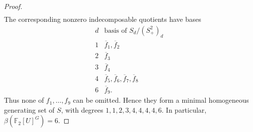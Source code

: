 \documentclass[10pt,a4paper]{amsart}
\begin{document}
\begin{proof}
\[\begin{array}{c|rrrrrrr}
			\end{array}
			\]
			The corresponding nonzero indecomposable quotients have bases
			\[
			\begin{array}{c|c}
				d&
				\text{basis of }S_{d}/(S_{+}^{2})_{d}\\ \hline
				1&\overline f_{1},\overline f_{2}\\
				2&\overline f_{3}\\
				3&\overline f_{4}\\
				4&\overline f_{5},\overline f_{6},
				\overline f_{7},\overline f_{8}\\
				6&\overline f_{9}.
			\end{array}
			\]
			Thus none of \(f_{1},\ldots,f_{9}\) can be omitted. Hence they form a minimal homogeneous generating set of \(S\), with degrees $1,1,2,3,4,4,4,4,6$. In particular, $\beta\!\left(\mathbb F_{2}[U]^{G}\right)=6$.
		
	\end{proof}
\end{document}
